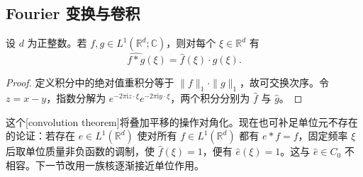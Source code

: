 \subsection{Fourier 变换与卷积}
\label{b2:subsec:030304}

\begin{theorem}[卷积定理]\label{b2:thm:03-convolution-transform}
设 \(d\) 为正整数。若 \(f,g\in L^1(\mathbb R^d;\mathbb C)\)，则对每个 \(\xi\in\mathbb R^d\) 有
\[
 \widehat{f*g}(\xi)=\widehat f(\xi)\cdot\widehat g(\xi).
\]
\end{theorem}
\begin{proof}
定义积分中的绝对值重积分等于 \(\|f\|_1\cdot\|g\|_1\)，故可交换次序。令 \(z=x-y\)，指数分解为 \(e^{-2\pi\mathrm{i}z\cdot\xi}e^{-2\pi\mathrm{i}y\cdot\xi}\)，两个积分分别为 \(\widehat f\) 与 \(\widehat g\)。
\end{proof}

这个[convolution theorem]将叠加平移的操作对角化。现在也可补足单位元不存在的论证：若存在 \(e\in L^1(\mathbb R^d)\) 使对所有 \(f\in L^1(\mathbb R^d)\) 都有 \(e*f=f\)，固定频率 \(\xi\) 后取单位质量非负函数的调制，使 \(\widehat f(\xi)=1\)，便有 \(\widehat e(\xi)=1\)。这与 \(\widehat e\in C_0\) 不相容。下一节改用一族核逐渐接近单位作用。
